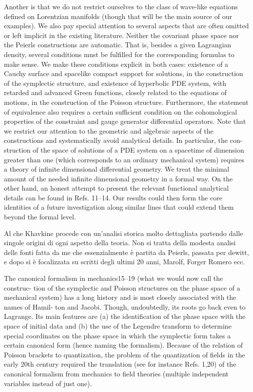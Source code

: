 \documentclass[Main]{subfiles}
\begin{document}
\begin{Warning}
Another is that we do not restrict ourselves to the class of wave-like equations defined on Lorentzian manifolds (though that will be the main source of our examples). 
We also pay special attention to several aspects that are often omitted or left implicit in the existing literature. 
Neither the covariant phase space nor the Peierls constructions are automatic. 
That is, besides a given Lagrangian density, several conditions must be fulfilled for the corresponding formulas to make sense.
We make these conditions explicit in both cases: existence of a Cauchy surface and spacelike compact support for solutions, in the construction of the symplectic structure, and existence of hyperbolic PDE system, with retarded and advanced Green functions, closely related to the equations of motions, in the construction of the Poisson structure. 
Furthermore, the statement of equivalence also requires a certain sufficient condition on the cohomological properties of the constraint and gauge generator differential operators. 
Note that we restrict our attention to the geometric and algebraic aspects of the constructions and systematically avoid analytical details.
In particular, the con- struction of the space of solutions of a PDE system on a spacetime of dimension greater than one (which corresponds to an ordinary mechanical system) requires a theory of infinite dimensional differential geometry. 
We treat the minimal amount of the needed infinite dimensional geometry in a formal way. 
On the other hand, an honest attempt to present the relevant functional analytical details can be found in Refs. 11–14. Our results could then form the core identities of a future investigation along similar lines that could extend them beyond the formal level.


Al che Khavkine procede con un'analisi storica molto dettagliata partendo dalle singole origini di ogni aspetto della teoria.
Non si tratta della modesta analisi delle fonti fatta da me che essenzialmente è partita da Peierls, passata per dewitt, e dopo si è focalizzata su scritti degli ultimi 20 anni, Marolf, Forger Romero ecc.

The canonical formalism in mechanics15–19 (what we would now call the construc- tion of the symplectic and Poisson structures on the phase space of a mechanical system) has a long history and is most closely associated with the names of Hamil- ton and Jacobi. Though, undoubtedly, its roots go back even to Lagrange. Its main features are (a) the identification of the phase space with the space of initial data and (b) the use of the Legendre transform to determine special coordinates on the phase space in which the symplectic form takes a certain canonical form (hence naming the formalism). Because of the relation of Poisson brackets to quantization, the problem of the quantization of fields in the early 20th century required the translation (see for instance Refs. 1,20) of the canonical formalism from mechanics to field theories (multiple independent variables instead of just one).


\end{Warning}
\end{document}

